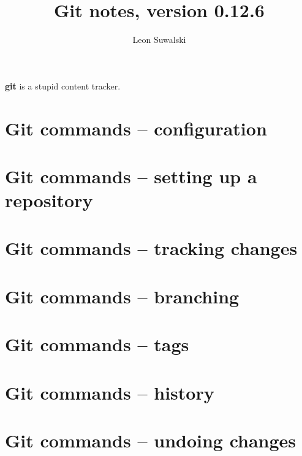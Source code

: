 \documentclass{charuun}
\title{Git notes, version 0.12.6}
\author{Leon Suwalski}
\begin{document}
\maketitle
\raggedright

\textbf{git} is a stupid content tracker.

\section{Git commands -- configuration}


\section{Git commands -- setting up a repository}



\section{Git commands -- tracking changes}






\section{Git commands -- branching}







\section{Git commands -- tags}


\section{Git commands -- history}







\section{Git commands -- undoing changes}




\end{document}

